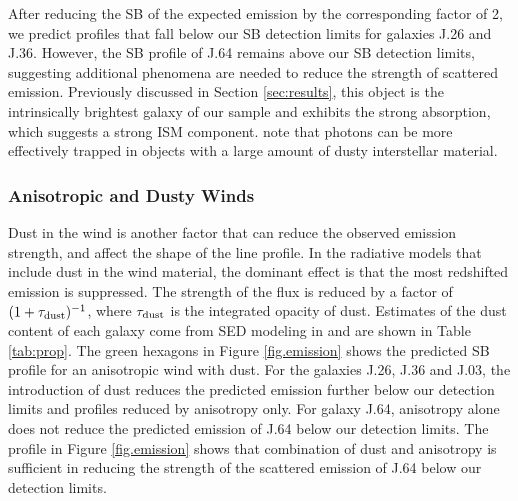 \documentclass[twocolumn]{aastex61}
\begin{document}
After reducing the SB of the expected  emission by the corresponding factor of 2, we predict profiles that fall below our SB detection limits for galaxies J.26 and J.36. However, the SB profile of J.64 remains above our SB detection limits, suggesting additional phenomena are needed to reduce the strength of scattered emission. Previously discussed in Section \ref{sec:results}, this object is the intrinsically brightest galaxy of our sample and exhibits the strong  absorption, which suggests a strong ISM component. \cite{Prochaska_2011} note that  photons can be more effectively trapped in objects with a large amount of dusty interstellar material. 

\subsubsection{Anisotropic and Dusty Winds}

Dust in the wind is another factor that can reduce the observed emission strength, and affect the shape of the line profile. 
In the \cite{Prochaska_2011} radiative models that include dust in the wind material, the dominant effect is that the most redshifted emission is suppressed. The strength of the flux is reduced by a factor of $(1+\tau_{\rm{dust}})^{-1}$, where $\tau_{\rm{dust}}$ is the integrated opacity of dust. Estimates of the dust content of each galaxy come from SED modeling in \cite{Rubin_2014} and are shown in Table \ref{tab:prop}. The green hexagons in Figure \ref{fig.emission} shows the predicted SB profile for an anisotropic wind with dust. For the galaxies J.26, J.36 and J.03, the introduction of dust reduces the predicted emission further below our detection limits and profiles reduced by anisotropy only. For galaxy J.64, anisotropy alone does not reduce the predicted emission of J.64 below our detection limits. The profile in Figure \ref{fig.emission} shows that combination of dust and anisotropy is sufficient in reducing the strength of the scattered emission of J.64 below our detection limits. 
\end{document}
